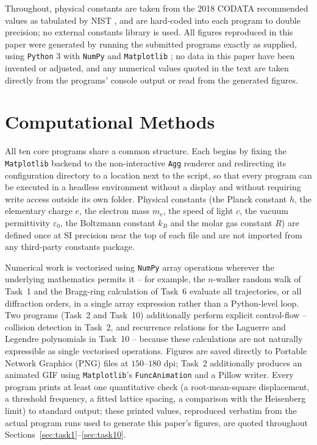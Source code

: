 \documentclass[11pt]{article}
\begin{document}
Throughout, physical constants are taken from the 2018 CODATA recommended values as tabulated by NIST \cite{codata2018}, and are hard-coded into each program to double precision; no external constants library is used. All figures reproduced in this paper were generated by running the submitted programs exactly as supplied, using \texttt{Python} 3 with \texttt{NumPy} \cite{numpy} and \texttt{Matplotlib} \cite{matplotlib}; no data in this paper have been invented or adjusted, and any numerical values quoted in the text are taken directly from the programs' console output or read from the generated figures.

\section{Computational Methods}
\label{sec:methods}

All ten core programs share a common structure. Each begins by fixing the \texttt{Matplotlib} backend to the non-interactive \texttt{Agg} renderer and redirecting its configuration directory to a location next to the script, so that every program can be executed in a headless environment without a display and without requiring write access outside its own folder. Physical constants (the Planck constant $h$, the elementary charge $e$, the electron mass $m_e$, the speed of light $c$, the vacuum permittivity $\varepsilon_0$, the Boltzmann constant $k_B$ and the molar gas constant $R$) are defined once at SI precision near the top of each file and are not imported from any third-party constants package.

Numerical work is vectorised using \texttt{NumPy} array operations wherever the underlying mathematics permits it -- for example, the $n$-walker random walk of Task~1 and the Bragg-ring calculation of Task~6 evaluate all trajectories, or all diffraction orders, in a single array expression rather than a Python-level loop. Two programs (Task~2 and Task~10) additionally perform explicit control-flow -- collision detection in Task~2, and recurrence relations for the Laguerre and Legendre polynomials in Task~10 -- because these calculations are not naturally expressible as single vectorised operations. Figures are saved directly to Portable Network Graphics (PNG) files at $150$--$180$ dpi; Task~2 additionally produces an animated GIF using \texttt{Matplotlib}'s \texttt{FuncAnimation} and a Pillow writer. Every program prints at least one quantitative check (a root-mean-square displacement, a threshold frequency, a fitted lattice spacing, a comparison with the Heisenberg limit) to standard output; these printed values, reproduced verbatim from the actual program runs used to generate this paper's figures, are quoted throughout Sections~\ref{sec:task1}--\ref{sec:task10}.
\end{document}
